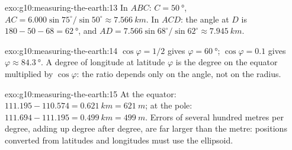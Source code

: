 \begin{solution}{exo:g10:measuring-the-earth:13}
In $ABC$: $C = \qty{50}{\degree}$, $AC = 6.000 \sin 75^\circ/\sin 50^\circ
\approx \qty{7.566}{km}$. In $ACD$: the angle at $D$ is $180 - 50 - 68 =
\qty{62}{\degree}$, and $AD = 7.566 \sin 68^\circ/\sin 62^\circ \approx
\qty{7.945}{km}$.
\end{solution}

\begin{solution}{exo:g10:measuring-the-earth:14}
$\cos\varphi = 1/2$ gives $\varphi = \qty{60}{\degree}$; $\cos\varphi = 0.1$
gives $\varphi \approx \qty{84.3}{\degree}$. A degree of longitude at
latitude $\varphi$ is the degree on the equator multiplied by $\cos\varphi$:
the ratio depends only on the angle, not on the radius.
\end{solution}

\begin{solution}{exo:g10:measuring-the-earth:15}
At the equator: $111.195 - 110.574 = \qty{0.621}{km} = \qty{621}{m}$; at the
pole: $111.694 - 111.195 = \qty{0.499}{km} = \qty{499}{m}$. Errors of several
hundred metres per degree, adding up degree after degree, are far larger than
the metre: positions converted from latitudes and longitudes must use the
ellipsoid.
\end{solution}

